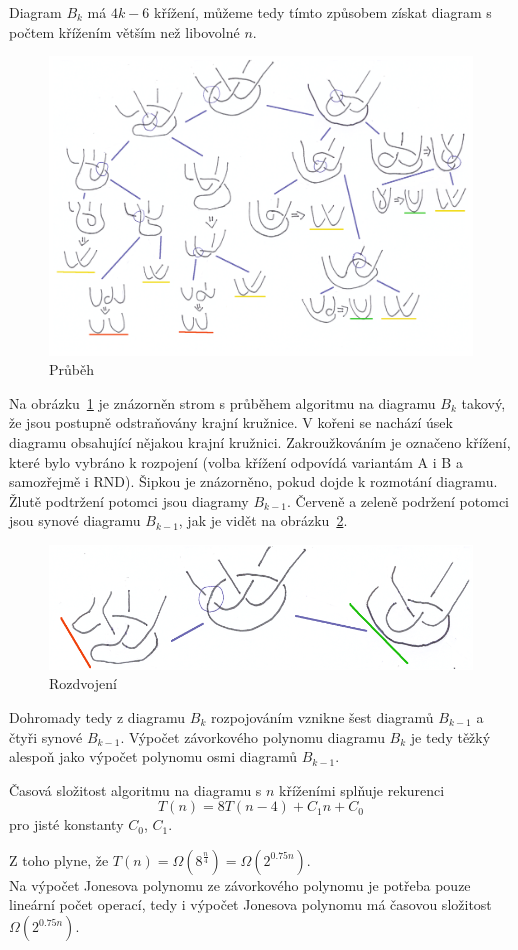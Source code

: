 \begin{dukaz}
Diagram $B_k$ má $4k-6$ křížení, můžeme tedy tímto způsobem získat diagram s počtem křížením větším než libovolné $n$.

\begin{figure}[p] \centering
\includegraphics[scale=0.68]{../img/horniodhad}
\caption{Průběh} \label{prubehhorni}
\end{figure}

Na obrázku~\ref{prubehhorni} je znázorněn strom s průběhem algoritmu na diagramu $B_k$ takový, že jsou postupně odstraňovány krajní kružnice. V kořeni se nachází úsek diagramu obsahující nějakou krajní kružnici. Zakroužkováním je označeno křížení, které bylo vybráno k rozpojení (volba křížení odpovídá variantám A i B a samozřejmě i RND). Šipkou je znázorněno, pokud dojde k rozmotání diagramu. Žlutě podtržení potomci jsou diagramy $B_{k-1}$. Červeně a zeleně podržení potomci jsou synové diagramu $B_{k-1}$, jak je vidět na obrázku~\ref{rozdvojeni}.

\begin{figure}[p] \centering
\includegraphics[scale=0.7]{../img/rozdvojeni}
\caption{Rozdvojení}  \label{rozdvojeni}
\end{figure}

Dohromady tedy z diagramu $B_k$ rozpojováním vznikne šest diagramů $B_{k-1}$ a čtyři synové $B_{k-1}$. Výpočet závorkového polynomu diagramu $B_k$ je tedy těžký alespoň jako výpočet polynomu osmi diagramů $B_{k-1}$. 

Časová složitost algoritmu na diagramu s $n$ kříženími splňuje rekurenci
$$ T(n) = 8T(n-4) + C_1 n + C_0  $$
pro jisté konstanty $C_0$, $C_1$.

Z toho plyne, že $T(n) = \Omega(8^{\frac{n}{4}})  =  \Omega(2^{0.75 n})$. \\

Na výpočet Jonesova polynomu ze závorkového polynomu je potřeba pouze lineární počet operací, tedy i výpočet Jonesova polynomu má časovou složitost $\Omega(2^{0.75n})$.
\end{dukaz}
